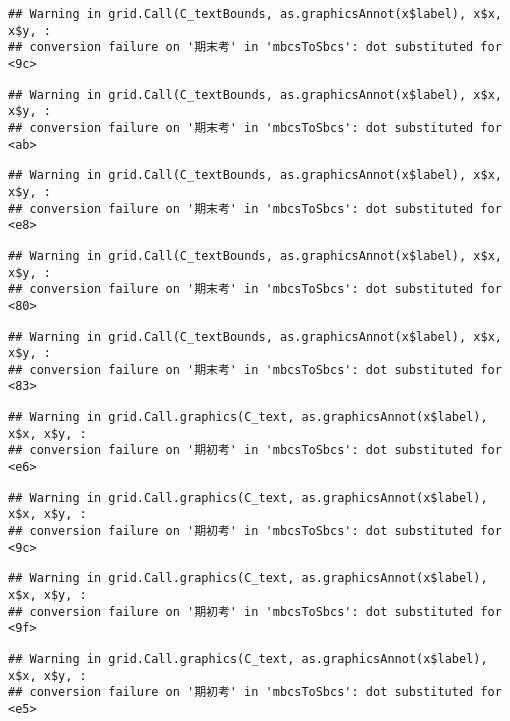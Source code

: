 \documentclass[
]{book}
\begin{document}
\begin{verbatim}
## Warning in grid.Call(C_textBounds, as.graphicsAnnot(x$label), x$x, x$y, :
## conversion failure on '期末考' in 'mbcsToSbcs': dot substituted for <9c>
\end{verbatim}

\begin{verbatim}
## Warning in grid.Call(C_textBounds, as.graphicsAnnot(x$label), x$x, x$y, :
## conversion failure on '期末考' in 'mbcsToSbcs': dot substituted for <ab>
\end{verbatim}

\begin{verbatim}
## Warning in grid.Call(C_textBounds, as.graphicsAnnot(x$label), x$x, x$y, :
## conversion failure on '期末考' in 'mbcsToSbcs': dot substituted for <e8>
\end{verbatim}

\begin{verbatim}
## Warning in grid.Call(C_textBounds, as.graphicsAnnot(x$label), x$x, x$y, :
## conversion failure on '期末考' in 'mbcsToSbcs': dot substituted for <80>
\end{verbatim}

\begin{verbatim}
## Warning in grid.Call(C_textBounds, as.graphicsAnnot(x$label), x$x, x$y, :
## conversion failure on '期末考' in 'mbcsToSbcs': dot substituted for <83>
\end{verbatim}

\begin{verbatim}
## Warning in grid.Call.graphics(C_text, as.graphicsAnnot(x$label), x$x, x$y, :
## conversion failure on '期初考' in 'mbcsToSbcs': dot substituted for <e6>
\end{verbatim}

\begin{verbatim}
## Warning in grid.Call.graphics(C_text, as.graphicsAnnot(x$label), x$x, x$y, :
## conversion failure on '期初考' in 'mbcsToSbcs': dot substituted for <9c>
\end{verbatim}

\begin{verbatim}
## Warning in grid.Call.graphics(C_text, as.graphicsAnnot(x$label), x$x, x$y, :
## conversion failure on '期初考' in 'mbcsToSbcs': dot substituted for <9f>
\end{verbatim}

\begin{verbatim}
## Warning in grid.Call.graphics(C_text, as.graphicsAnnot(x$label), x$x, x$y, :
## conversion failure on '期初考' in 'mbcsToSbcs': dot substituted for <e5>
\end{verbatim}
\end{document}
